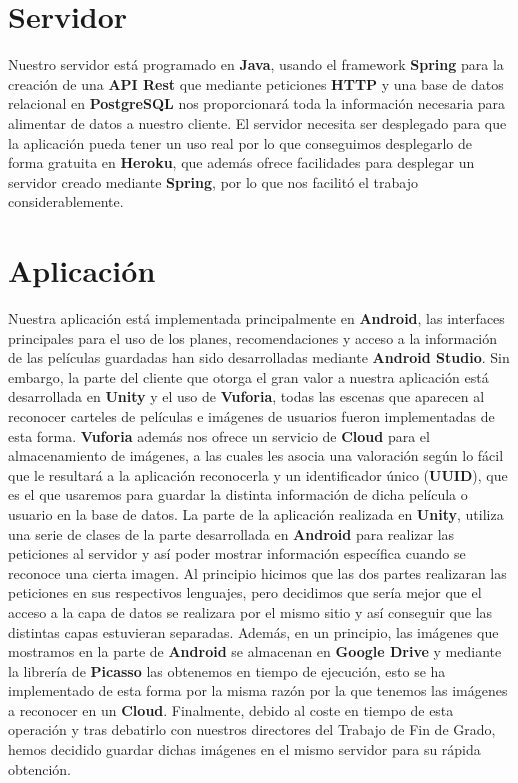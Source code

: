 \section{Servidor}
\label{makereference4.2}
Nuestro servidor está programado en \textbf{Java}, usando el framework \textbf{Spring} para la creación de una \textbf{API Rest} que mediante peticiones \textbf{HTTP} y una base de datos relacional en \textbf{PostgreSQL} nos proporcionará
toda la información necesaria para alimentar de datos a nuestro cliente. El servidor necesita ser desplegado para que la aplicación pueda tener un uso real por lo que conseguimos desplegarlo de forma gratuita en \textbf{Heroku}, que además ofrece
facilidades para desplegar un servidor creado mediante \textbf{Spring}, por lo que nos facilitó el trabajo considerablemente.

\section{Aplicación}
\label{makereference4.3}
Nuestra aplicación está implementada principalmente en \textbf{Android}, las interfaces principales para el uso de los planes, recomendaciones y acceso a la información de las películas guardadas han sido desarrolladas mediante \textbf{Android Studio}. Sin embargo,
la parte del cliente que otorga el gran valor a nuestra aplicación está desarrollada en \textbf{Unity} y el uso de \textbf{Vuforia}, todas las escenas que aparecen al reconocer carteles de películas e imágenes de usuarios fueron implementadas de esta forma. \textbf{Vuforia} además nos ofrece un
servicio de \textbf{Cloud} para el almacenamiento de imágenes, a las cuales les asocia una valoración según lo fácil que le resultará a la aplicación reconocerla y un identificador único (\textbf{UUID}), que es el que usaremos para guardar la distinta información de dicha película o usuario en la base de datos.
La parte de la aplicación realizada en \textbf{Unity}, utiliza una serie de clases de la parte desarrollada en \textbf{Android} para realizar las peticiones al servidor y así poder mostrar información específica cuando se reconoce una cierta imagen.
Al principio hicimos que las dos partes realizaran las peticiones en sus respectivos lenguajes, pero decidimos que sería mejor que el acceso a la capa de datos se realizara por el mismo sitio y así conseguir que las distintas capas estuvieran separadas.
Además, en un principio, las imágenes que mostramos en la parte de \textbf{Android} se almacenan en \textbf{Google Drive} y mediante la librería de \textbf{Picasso} las obtenemos en tiempo de ejecución, esto se ha implementado de esta forma por la misma razón por la que tenemos las imágenes a reconocer en un \textbf{Cloud}.
Finalmente, debido al coste en tiempo de esta operación y tras debatirlo con nuestros directores del Trabajo de Fin de Grado, hemos decidido guardar dichas imágenes en el mismo servidor para su rápida obtención.

